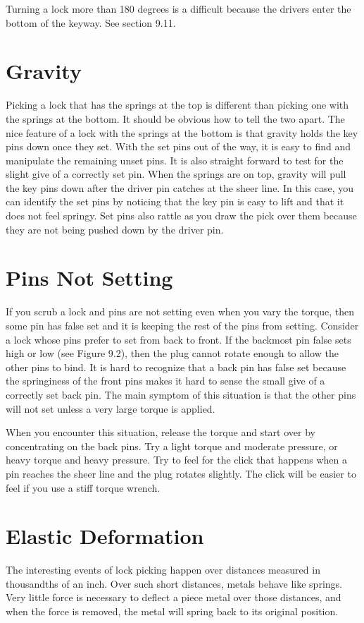 Turning a lock more than 180 degrees is a difficult because the drivers enter the bottom
of the keyway. See section 9.11.

\section{Gravity}
Picking a lock that has the springs at the top is different than picking one with the springs
at the bottom. It should be obvious how to tell the two apart. The nice feature of a lock
with the springs at the bottom is that gravity holds the key pins down once they set. With
the set pins out of the way, it is easy to find and manipulate the remaining unset pins. It is
also straight forward to test for the slight give of a correctly set pin. When the springs are
on top, gravity will pull the key pins down after the driver pin catches at the sheer line. In
this case, you can identify the set pins by noticing that the key pin is easy to lift and that it
does not feel springy. Set pins also rattle as you draw the pick over them because they are
not being pushed down by the driver pin.

\section{Pins Not Setting}
If you scrub a lock and pins are not setting even when you vary the torque, then some pin
has false set and it is keeping the rest of the pins from setting. Consider a lock whose pins
prefer to set from back to front. If the backmost pin false sets high or low (see Figure 9.2),
then the plug cannot rotate enough to allow the other pins to bind. It is hard to recognize
that a back pin has false set because the springiness of the front pins makes it hard to sense
the small give of a correctly set back pin. The main symptom of this situation is that the
other pins will not set unless a very large torque is applied.

When you encounter this situation, release the torque and start over by concentrating
on the back pins. Try a light torque and moderate pressure, or heavy torque and heavy
pressure. Try to feel for the click that happens when a pin reaches the sheer line and the
plug rotates slightly. The click will be easier to feel if you use a stiff torque wrench.

\section{Elastic Deformation}
The interesting events of lock picking happen over distances measured in thousandths of an
inch. Over such short distances, metals behave like springs. Very little force is necessary to deflect a piece metal over those distances, and when the force is removed, the metal will
spring back to its original position.

